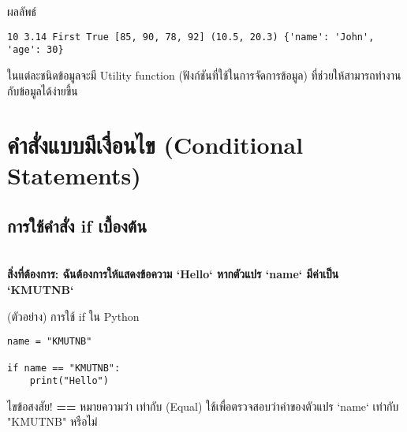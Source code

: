 \documentclass[12pt,a4paper]{article}
\newcommand{\textlight}[1]{{\thailightfont #1}}
\begin{document}
\begin{resultbox}{ผลลัพธ์}
\begin{verbatim}
10 3.14 First True [85, 90, 78, 92] (10.5, 20.3) {'name': 'John', 'age': 30}
\end{verbatim}
\end{resultbox}

\textlight{ในแต่ละชนิดข้อมูลจะมี Utility function (ฟังก์ชันที่ใช้ในการจัดการข้อมูล) ที่ช่วยให้สามารถทำงานกับข้อมูลได้ง่ายขึ้น}

\section{คำสั่งแบบมีเงื่อนไข (Conditional Statements)}

\hspace{1cm}\textlight{คำสั่งแบบมีเงื่อนไข (Conditional Statements) เป็นคำสั่งที่ใช้ในการตัดสินใจว่าควรทำอะไรต่อไปในโปรแกรมตามเงื่อนไขที่กำหนด คำสั่งเหล่านี้ช่วยให้โปรแกรมสามารถทำงานได้อย่างยืดหยุ่นและตอบสนองต่อสถานการณ์ต่างๆ (โค้ดด้านล่าง)}

\subsection{การใช้คำสั่ง if เบื้องต้น}

\hspace{1cm}\textlight{คำสั่ง if ใช้เพื่อตรวจสอบเงื่อนไข ถ้าเงื่อนไขเป็นจริง (True) จะทำการดำเนินการตามที่กำหนดไว้ในบล็อกของ if ดังกล่าว}\\
\textlight{\textbf{สิ่งที่ต้องการ: ฉันต้องการให้แสดงข้อความ `Hello` หากตัวแปร `name` มีค่าเป็น `KMUTNB`}}

\begin{codebox}{(ตัวอย่าง) การใช้ if ใน Python}
\begin{lstlisting}[style=python]
name = "KMUTNB"

if name == "KMUTNB":
    print("Hello")
\end{lstlisting}
\end{codebox}

\begin{answerbox}{ไขข้อสงสัย!}
\textlight{\textbf{==} หมายความว่า เท่ากับ (Equal) ใช้เพื่อตรวจสอบว่าค่าของตัวแปร `name` เท่ากับ "KMUTNB" หรือไม่}
\end{answerbox}
\end{document}

